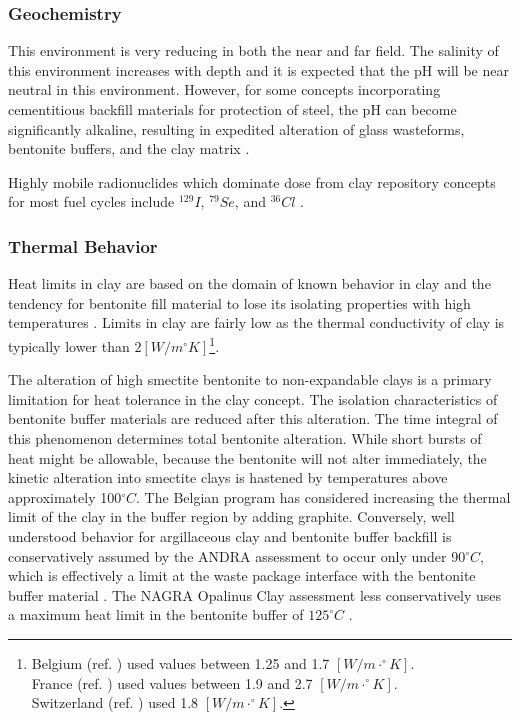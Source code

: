 \subsubsection{Geochemistry}

This environment is very reducing in both the near and far field.
The salinity of this environment increases with depth and it is 
expected that the pH will be near neutral in this environment. However, for 
some concepts incorporating cementitious backfill materials for protection 
of steel, the pH can become significantly alkaline, resulting in 
expedited alteration of glass wasteforms, bentonite buffers, and the clay 
matrix \cite{andra_argile:_2005}.


Highly mobile radionuclides which dominate dose from clay repository concepts 
for most fuel cycles include $^{129}I$, $^{79}Se$, and $^{36}Cl$ 
\cite{swift_applying_2010}. 

\subsubsection{Thermal Behavior}
\label{subsec:claythermal}


Heat limits in clay are based on the domain of known behavior in clay and the 
tendency for bentonite fill material to lose its isolating properties with high 
temperatures \cite{andra_argile:_2005, pusch_alteration_1987}. Limits in clay 
are fairly low as the thermal conductivity of clay is typically lower than 
$2[W/m^{\circ}K]$\footnote{
Belgium (ref. \cite{ondraf-niras_technical_2001}) used values between 1.25 and 1.7 $[W/m\cdot^{\circ}K]$.\\
France (ref. \cite{andra_argile:_2005}) used values between 1.9 and 2.7 $[W/m\cdot^{\circ}K]$.\\
Switzerland (ref. \cite{johnson_calculations_2002}) used 1.8 $[W/m\cdot^{\circ}K]$.
}.

The alteration of high smectite bentonite to non-expandable clays is a primary 
limitation for heat tolerance in the clay concept. The isolation characteristics 
of bentonite buffer materials are reduced after this alteration. The time 
integral of this phenomenon determines total bentonite alteration. While short 
bursts of heat might be allowable, because the bentonite will not alter 
immediately, the kinetic alteration into smectite clays is hastened by 
temperatures above approximately 100$^{\circ}C$\cite{pusch_alteration_1987}. 
The Belgian program has considered increasing the thermal limit of the clay in
the buffer region by adding graphite.
Conversely, well understood behavior for argillaceous clay and bentonite buffer backfill
is conservatively assumed by the \gls{ANDRA} assessment to occur only under  
90$^{\circ}C$, which is effectively a limit at the waste package interface with 
the bentonite buffer material\cite{andra_argile:_2005} .
The \gls{NAGRA} Opalinus Clay assessment less conservatively 
uses a maximum heat limit in the bentonite buffer of $125^{\circ}C$
\cite{johnson_project_2002} .

